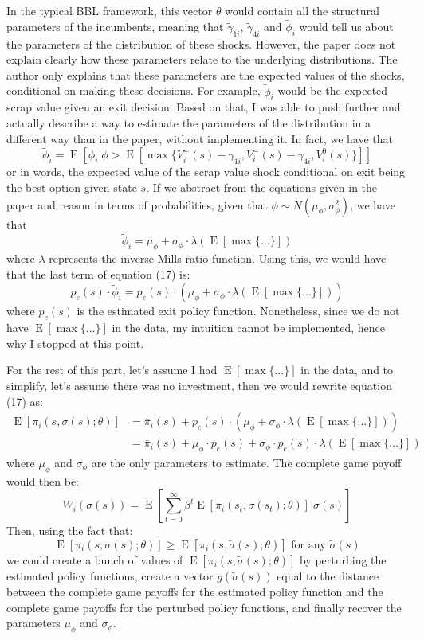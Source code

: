 \documentclass[12pt]{article}
\newcommand{\E}[1]{\operatorname{E}\left[#1\right]}
\begin{document}
In the typical BBL framework, this vector $\theta$ would contain all the structural parameters of the incumbents, meaning that $\tilde \gamma_{1i}$, $\tilde \gamma_{4i}$ and $\tilde{\phi}_i$ would tell us about the parameters of the distribution of these shocks. However, the paper does not explain clearly how these parameters relate to the underlying distributions. The author only explains that these parameters are the expected values of the shocks, conditional on making these decisions. For example, $\tilde{\phi}_i$ would be the expected scrap value given an exit decision. Based on that, I was able to push further and actually describe a way to estimate the parameters of the distribution in a different way than in the paper, without implementing it. In fact, we have that $$\tilde{\phi}_i = \E{\phi_i | \phi > \E{\max\{V_i^+(s) - \gamma_{1i}, V_i^-(s) - \gamma_{4i}, V_i^0(s)\}}} $$ or in words, the expected value of the scrap value shock conditional on exit being the best option given state $s$. If we abstract from the equations given in the paper and reason in terms of probabilities, given that $\phi \sim N(\mu_{\phi}, \sigma_{\phi}^2)$, we have that $$\tilde{\phi}_i = \mu_{\phi} + \sigma_{\phi} \cdot \lambda(\E{\max\{...\}}) $$ where $\lambda$ represents the inverse Mills ratio function. Using this, we would have that the last term of equation (17) is: $$p_e(s)\cdot \tilde{\phi}_i = p_e(s)\cdot \left( \mu_{\phi} + \sigma_{\phi} \cdot \lambda(\E{\max\{...\}}) \right) $$ where $p_e(s)$ is the estimated exit policy function. Nonetheless, since we do not have $\E{\max\{...\}}$ in the data, my intuition cannot be implemented, hence why I stopped at this point.

For the rest of this part, let's assume I had $\E{\max\{...\}}$ in the data, and to simplify, let's assume there was no investment, then we would rewrite equation (17) as: \begin{align*}
\E{\pi_i(s, \sigma(s); \theta)} & = \bar \pi_i(s) + p_e(s)\cdot \left( \mu_{\phi} + \sigma_{\phi} \cdot \lambda(\E{\max\{...\}}) \right) \\
& = \bar \pi_i(s) + \mu_{\phi} \cdot p_e(s) + \sigma_{\phi} \cdot p_e(s) \cdot \lambda(\E{\max\{...\}})
\end{align*}
where $\mu_{\phi}$ and $\sigma_{\phi}$ are the only parameters to estimate. The complete game payoff would then be: $$W_i(\sigma(s)) = \E{\sum_{t=0}^{\infty} \beta^t \E{\pi_i(s_t, \sigma(s_t); \theta)} | \sigma(s)} $$
Then, using the fact that: $$
\E{\pi_i(s, \sigma(s); \theta)} \geq \E{\pi_i(s, \tilde\sigma(s); \theta)} \text{ for any } \tilde\sigma(s)$$ we could create a bunch of values of $\E{\pi_i(s, \tilde\sigma(s); \theta)} $ by perturbing the estimated policy functions, create a vector $g(\tilde\sigma(s))$ equal to the distance between the complete game payoffs for the estimated policy function and the complete game payoffs for the perturbed policy functions, and finally recover the parameters $\mu_{\phi}$ and $\sigma_{\phi}$.
\end{document}
